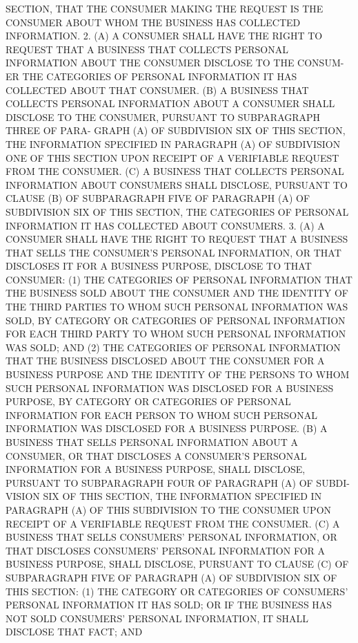  SECTION, THAT THE CONSUMER MAKING THE REQUEST IS THE CONSUMER ABOUT WHOM
 THE BUSINESS HAS COLLECTED INFORMATION.
   2. (A) A CONSUMER SHALL HAVE THE RIGHT TO REQUEST THAT A BUSINESS THAT
 COLLECTS PERSONAL INFORMATION ABOUT THE CONSUMER DISCLOSE TO THE CONSUM-
 ER  THE  CATEGORIES  OF PERSONAL INFORMATION IT HAS COLLECTED ABOUT THAT
 CONSUMER.
   (B) A BUSINESS THAT COLLECTS PERSONAL  INFORMATION  ABOUT  A  CONSUMER
 SHALL  DISCLOSE TO THE CONSUMER, PURSUANT TO SUBPARAGRAPH THREE OF PARA-
 GRAPH (A) OF SUBDIVISION SIX OF THIS SECTION, THE INFORMATION  SPECIFIED
 IN  PARAGRAPH  (A)  OF SUBDIVISION ONE OF THIS SECTION UPON RECEIPT OF A
 VERIFIABLE REQUEST FROM THE CONSUMER.
   (C) A BUSINESS THAT  COLLECTS  PERSONAL  INFORMATION  ABOUT  CONSUMERS
 SHALL DISCLOSE, PURSUANT TO CLAUSE (B) OF SUBPARAGRAPH FIVE OF PARAGRAPH
 (A)  OF  SUBDIVISION  SIX  OF  THIS  SECTION, THE CATEGORIES OF PERSONAL
 INFORMATION IT HAS COLLECTED ABOUT CONSUMERS.
   3. (A) A CONSUMER SHALL HAVE THE RIGHT TO REQUEST THAT A BUSINESS THAT
 SELLS THE CONSUMER'S PERSONAL INFORMATION, OR THAT DISCLOSES  IT  FOR  A
 BUSINESS  PURPOSE,  DISCLOSE  TO  THAT  CONSUMER:  (1) THE CATEGORIES OF
 PERSONAL INFORMATION THAT THE BUSINESS SOLD ABOUT THE CONSUMER  AND  THE
 IDENTITY  OF  THE  THIRD  PARTIES  TO WHOM SUCH PERSONAL INFORMATION WAS
 SOLD, BY CATEGORY OR CATEGORIES OF PERSONAL INFORMATION FOR  EACH  THIRD
 PARTY TO WHOM SUCH PERSONAL INFORMATION WAS SOLD; AND (2) THE CATEGORIES
 OF  PERSONAL  INFORMATION THAT THE BUSINESS DISCLOSED ABOUT THE CONSUMER
 FOR A BUSINESS PURPOSE AND THE IDENTITY OF  THE  PERSONS  TO  WHOM  SUCH
 PERSONAL  INFORMATION  WAS DISCLOSED FOR A BUSINESS PURPOSE, BY CATEGORY
 OR CATEGORIES OF PERSONAL INFORMATION  FOR  EACH  PERSON  TO  WHOM  SUCH
 PERSONAL INFORMATION WAS DISCLOSED FOR A BUSINESS PURPOSE.
   (B)  A  BUSINESS  THAT SELLS PERSONAL INFORMATION ABOUT A CONSUMER, OR
 THAT DISCLOSES A CONSUMER'S PERSONAL INFORMATION FOR A BUSINESS PURPOSE,
 SHALL DISCLOSE, PURSUANT TO SUBPARAGRAPH FOUR OF PARAGRAPH (A) OF SUBDI-
 VISION SIX OF THIS SECTION, THE INFORMATION SPECIFIED IN  PARAGRAPH  (A)
 OF THIS SUBDIVISION TO THE CONSUMER UPON RECEIPT OF A VERIFIABLE REQUEST
 FROM THE CONSUMER.
   (C)  A  BUSINESS  THAT  SELLS CONSUMERS' PERSONAL INFORMATION, OR THAT
 DISCLOSES CONSUMERS' PERSONAL INFORMATION FOR A BUSINESS PURPOSE,  SHALL
 DISCLOSE,  PURSUANT  TO CLAUSE (C) OF SUBPARAGRAPH FIVE OF PARAGRAPH (A)
 OF SUBDIVISION SIX OF THIS SECTION: (1) THE CATEGORY  OR  CATEGORIES  OF
 CONSUMERS'  PERSONAL INFORMATION IT HAS SOLD; OR IF THE BUSINESS HAS NOT
 SOLD CONSUMERS' PERSONAL INFORMATION, IT SHALL DISCLOSE THAT  FACT;  AND
